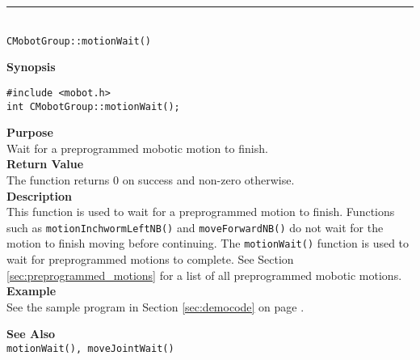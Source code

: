 \noindent
\vspace{5pt}
\rule{4.5in}{0.015in}\\
\noindent
{\LARGE \texttt{CMobotGroup::motionWait()}}\\
{}

\noindent
{\bf Synopsis}
\vspace{-8pt}
\begin{verbatim}
#include <mobot.h>
int CMobotGroup::motionWait();
\end{verbatim}

\noindent
{\bf Purpose}\\
Wait for a preprogrammed mobotic motion to finish.\\

\noindent
{\bf Return Value}\\
The function returns 0 on success and non-zero otherwise.\\

\noindent
{\bf Description}\\
This function is used to wait for a preprogrammed motion to finish. Functions such as
\texttt{motionInchwormLeftNB()} and \texttt{moveForwardNB()} do not wait for the motion to finish
moving before continuing. The
\texttt{motionWait()} function is used to wait for
preprogrammed motions to complete. See Section \ref{sec:preprogrammed_motions} for 
a list of all preprogrammed mobotic motions.\\

\noindent
{\bf Example}\\
See the sample program in Section \ref{sec:democode} on page \pageref{sec:democode}.
\noindent

\noindent
{\bf See Also}\\
\texttt{motionWait(), moveJointWait()}

